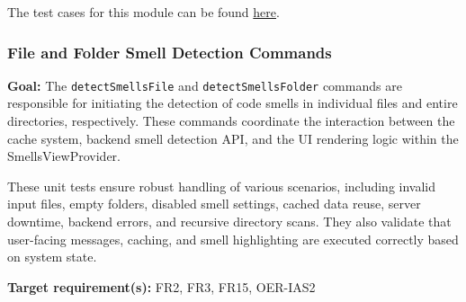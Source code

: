 \documentclass[12pt, titlepage]{article}
\begin{document}
\noindent The test cases for this module can be found
\href{https://github.com/ssm-lab/capstone--sco-vs-code-plugin/blob/plugin-multi-file/test/commands/resetConfiguration.test.ts}{here}.

\subsubsection{File and Folder Smell Detection Commands}

\textbf{Goal:} The \texttt{detectSmellsFile} and \texttt{detectSmellsFolder} commands are responsible for initiating the detection of code smells in individual files and entire directories, respectively. These commands coordinate the interaction between the cache system, backend smell detection API, and the UI rendering logic within the SmellsViewProvider.

\medskip

\noindent These unit tests ensure robust handling of various scenarios, including invalid input files, empty folders, disabled smell settings, cached data reuse, server downtime, backend errors, and recursive directory scans. They also validate that user-facing messages, caching, and smell highlighting are executed correctly based on system state.

\medskip

\noindent\textbf{Target requirement(s):} FR2, FR3, FR15, OER-IAS2~\cite{SRS} \\
\end{document}
